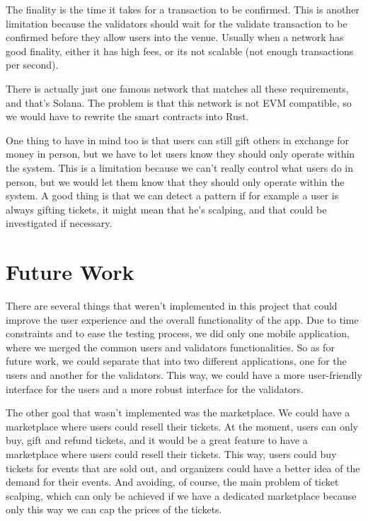 The finality is the time it takes for a transaction to be confirmed. This is
another limitation because the validators should wait for the validate
transaction to be confirmed before they allow users into the venue. Usually
when a network has good finality, either it has high fees, or its not scalable
(not enough transactions per second).

There is actually just one famous network that matches all these requirements,
and that's Solana. The problem is that this network is not EVM compatible, so
we would have to rewrite the smart contracts into Rust.

One thing to have in mind too is that users can still gift others in exchange
for money in person, but we have to let users know they should only operate
within the system. This is a limitation because we can't really control what
users do in person, but we would let them know that they should only operate
within the system. A good thing is that we can detect a pattern if for example
a user is always gifting tickets, it might mean that he's scalping, and that
could be investigated if necessary.

\section{Future Work}
\label{sec:future_work}

There are several things that weren't implemented in this project that could
improve the user experience and the overall functionality of the app. Due to
time constraints and to ease the testing process, we did only one mobile
application, where we merged the common users and validators functionalities.
So as for future work, we could separate that into two different applications,
one for the users and another for the validators. This way, we could have a
more user-friendly interface for the users and a more robust interface for the
validators.

The other goal that wasn't implemented was the marketplace. We could have a
marketplace where users could resell their tickets. At the moment, users can
only buy, gift and refund tickets, and it would be a great feature to have a
marketplace where users could resell their tickets. This way, users could buy
tickets for events that are sold out, and organizers could have a better idea
of the demand for their events. And avoiding, of course, the main problem of
ticket scalping, which can only be achieved if we have a dedicated marketplace
because only this way we can cap the prices of the tickets.

